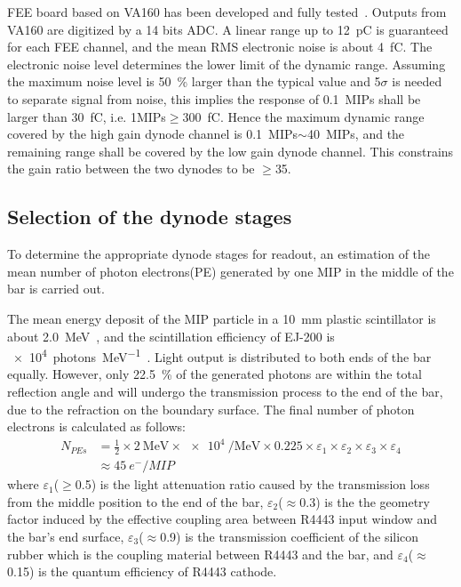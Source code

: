 \documentclass[5p, times]{elsarticle}
\begin{document}
FEE board based on VA160 has been developed and fully tested~\cite{fee}. Outputs from VA160 are digitized by a 14 bits ADC.
A linear range up to \SI{12}{\pico\coulomb} is guaranteed for each FEE channel, and the mean RMS electronic noise is about \SI{4}{\femto\coulomb}. 
The electronic noise level determines the lower limit of the dynamic range.
Assuming the maximum noise level is \SI{50}{\percent} larger than the typical value and 5$\sigma$ is needed to separate signal from noise, this implies the response of \SI{0.1}{MIPs} shall be larger than \SI{30}{\femto\coulomb}, i.e. 1MIPs$\geq$\SI{300}{\femto\coulomb}.
Hence the maximum dynamic range covered by the high gain dynode channel is \SI{0.1}{MIPs}$\sim$\SI{40}{MIPs}, and the remaining range shall be covered by the low gain dynode channel.
This constrains the gain ratio between the two dynodes to be $\geq$35.

\subsection{Selection of the dynode stages}
\label{sec:dynodes_selection}
To determine the appropriate dynode stages for readout, an estimation of the mean number of photon electrons(PE) generated by one MIP in the middle of the bar is carried out.

The mean energy deposit of the MIP particle in a \SI{10}{\milli\meter} plastic scintillator is about \SI{2.0}{\mega\electronvolt}~\cite{olive_review_2014}, and the scintillation efficiency of EJ-200 is \SI[per-mode=symbol]{e4}{photons\per\mega\electronvolt}~\cite{scintillator}.
Light output is distributed to both ends of the bar equally.
However, only \SI{22.5}{\percent} of the generated photons are within the total reflection angle and will undergo the transmission process to the end of the bar, due to the refraction on the boundary surface.
The final number of photon electrons is calculated as follows:
\begin{align}
 N_{PEs} &= \frac{1}{2} \times \SI[per-mode=symbol]{2}{\mega\electronvolt} \times \SI{e4}{\per\mega\electronvolt} \times 0.225
           \times \varepsilon_{1} \times \varepsilon_{2} \times \varepsilon_{3} \times \varepsilon_{4} \nonumber \\
         &\approx \SI{45}{e^-\per{MIP}}
\label{eq:pes}
\end{align} 
where $\varepsilon_1$($\geq$0.5) is the light attenuation ratio caused by the transmission loss from the middle position to the end of the bar,
$\varepsilon_2$($\approx$0.3) is the the geometry factor induced by the effective coupling area between R4443 input window and the bar's end surface,
$\varepsilon_3$($\approx$0.9) is the transmission coefficient of the silicon rubber which is the coupling material between R4443 and the bar,
and $\varepsilon_4$($\approx$0.15) is the quantum efficiency of R4443 cathode.
\end{document}
